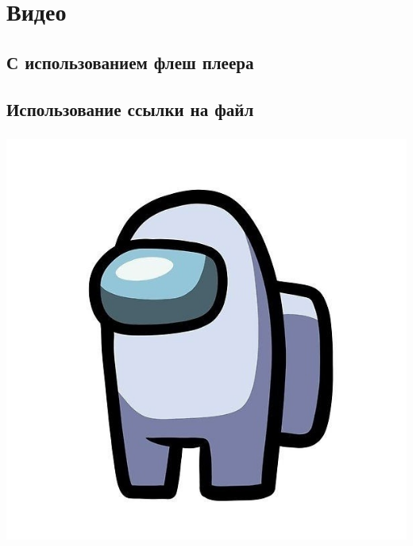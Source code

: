 \documentclass[russian]{beamer}
\begin{document}
\section{Видео}
\subsection{С использованием флеш плеера}
\begin{frame}
	\frametitle{\insertsubsection}
\end{frame}

\subsection{Использование ссылки на файл}
\begin{frame}
	\begin{center}
		\frametitle{\insertsubsection}
		\href{run:AMOGUS.avi}{\includegraphics[scale=0.25]{AMOGUS.jpg}}
	\end{center}
\end{frame}

\begin{frame}
		
\end{frame}
\end{document}
